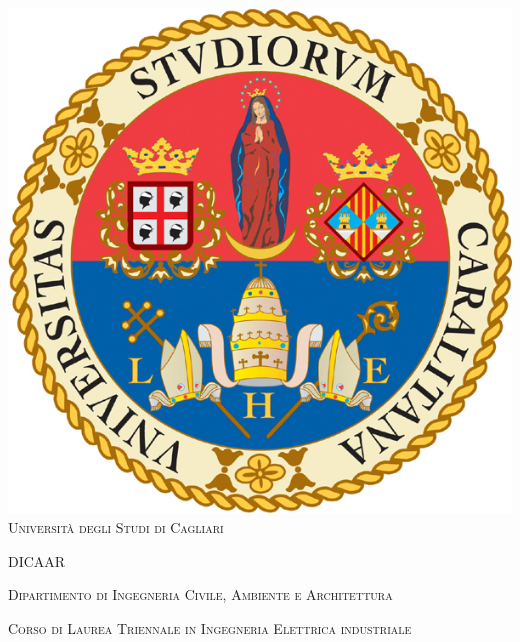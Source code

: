 \begin{titlepage}
	\begin{center}
		
		\includegraphics[scale=.45]{./title/logo_CA.jpg}
		\\
		\vspace{1cm}
		\textsc{\large Università degli Studi di Cagliari}
		\vspace{1.2cm}
		
		\textsc{\Large DICAAR}
		\vspace{0.5cm}
		
		\textsc{\large Dipartimento di Ingegneria Civile, Ambiente e Architettura}
		\vspace{1.0cm}
		
		\textsc{\large Corso di Laurea {Triennale} in Ingegneria Elettrica industriale}\hspace{0.8cm}
		
		\vspace{0.8cm}
		

\end{center}
\end{titlepage}
